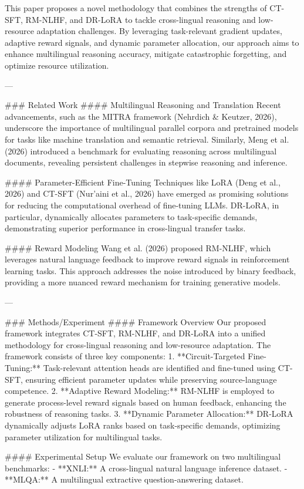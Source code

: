 This paper proposes a novel methodology that combines the strengths of CT-SFT, RM-NLHF, and DR-LoRA to tackle cross-lingual reasoning and low-resource adaptation challenges. By leveraging task-relevant gradient updates, adaptive reward signals, and dynamic parameter allocation, our approach aims to enhance multilingual reasoning accuracy, mitigate catastrophic forgetting, and optimize resource utilization.

---

### Related Work
#### Multilingual Reasoning and Translation
Recent advancements, such as the MITRA framework (Nehrdich & Keutzer, 2026), underscore the importance of multilingual parallel corpora and pretrained models for tasks like machine translation and semantic retrieval. Similarly, Meng et al. (2026) introduced a benchmark for evaluating reasoning across multilingual documents, revealing persistent challenges in stepwise reasoning and inference.

#### Parameter-Efficient Fine-Tuning
Techniques like LoRA (Deng et al., 2026) and CT-SFT (Nur’aini et al., 2026) have emerged as promising solutions for reducing the computational overhead of fine-tuning LLMs. DR-LoRA, in particular, dynamically allocates parameters to task-specific demands, demonstrating superior performance in cross-lingual transfer tasks.

#### Reward Modeling
Wang et al. (2026) proposed RM-NLHF, which leverages natural language feedback to improve reward signals in reinforcement learning tasks. This approach addresses the noise introduced by binary feedback, providing a more nuanced reward mechanism for training generative models.

---

### Methods/Experiment
#### Framework Overview
Our proposed framework integrates CT-SFT, RM-NLHF, and DR-LoRA into a unified methodology for cross-lingual reasoning and low-resource adaptation. The framework consists of three key components:
1. **Circuit-Targeted Fine-Tuning:** Task-relevant attention heads are identified and fine-tuned using CT-SFT, ensuring efficient parameter updates while preserving source-language competence.
2. **Adaptive Reward Modeling:** RM-NLHF is employed to generate process-level reward signals based on human feedback, enhancing the robustness of reasoning tasks.
3. **Dynamic Parameter Allocation:** DR-LoRA dynamically adjusts LoRA ranks based on task-specific demands, optimizing parameter utilization for multilingual tasks.

#### Experimental Setup
We evaluate our framework on two multilingual benchmarks:
- **XNLI:** A cross-lingual natural language inference dataset.
- **MLQA:** A multilingual extractive question-answering dataset.

